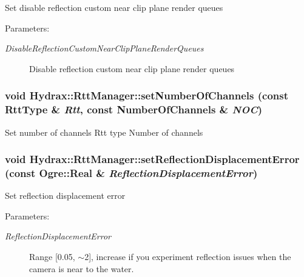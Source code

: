 \begin{CompactItemize}
Set disable reflection custom near clip plane render queues \begin{Desc}
\item[Parameters:]
\begin{description}
\item[{\em DisableReflectionCustomNearClipPlaneRenderQueues}]Disable reflection custom near clip plane render queues \end{description}
\end{Desc}
\hypertarget{class_hydrax_1_1_rtt_manager_009e9c7631dad8d588790401cab753b6}{
\subsubsection[{setNumberOfChannels}]{\setlength{\rightskip}{0pt plus 5cm}void Hydrax::RttManager::setNumberOfChannels (const {\bf RttType} \& {\em Rtt}, \/  const {\bf NumberOfChannels} \& {\em NOC})}}
\label{class_hydrax_1_1_rtt_manager_009e9c7631dad8d588790401cab753b6}


Set number of channels  Rtt type  Number of channels \hypertarget{class_hydrax_1_1_rtt_manager_7b473a60a06df9d943a50939e3b26377}{
\subsubsection[{setReflectionDisplacementError}]{\setlength{\rightskip}{0pt plus 5cm}void Hydrax::RttManager::setReflectionDisplacementError (const Ogre::Real \& {\em ReflectionDisplacementError})}}
\label{class_hydrax_1_1_rtt_manager_7b473a60a06df9d943a50939e3b26377}


Set reflection displacement error \begin{Desc}
\item[Parameters:]
\begin{description}
\item[{\em ReflectionDisplacementError}]Range \mbox{[}0.05, $\sim$2\mbox{]}, increase if you experiment reflection issues when the camera is near to the water. \end{description}
\end{Desc}
\hypertarget{class_hydrax_1_1_rtt_manager_bf7d8e05771b9f904efa09fe94ab0907}{
}
\end{CompactItemize}
